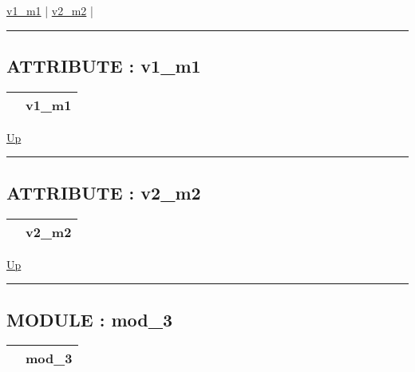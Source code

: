 \par


\hyperlink{ecldoc:intest.example_2.mod_2.v1_m1}{v1\_m1}  |
\hyperlink{ecldoc:intest.example_2.mod_2.v2_m2}{v2\_m2}  |

\rule{\textwidth}{0.4pt}

\subsection*{ATTRIBUTE : v1\_m1}
\hypertarget{ecldoc:intest.example_2.mod_2.v1_m1}{}

{\renewcommand{\arraystretch}{1.5}
\begin{tabularx}{\textwidth}{|>{\raggedright\arraybackslash}l|X|}
\hline
\hspace{0pt} & v1\_m1 \\
\hline
\end{tabularx}
}

\hyperlink{ecldoc:intest.example_2.mod_2}{Up}

\par


\rule{\textwidth}{0.4pt}
\subsection*{ATTRIBUTE : v2\_m2}
\hypertarget{ecldoc:intest.example_2.mod_2.v2_m2}{}

{\renewcommand{\arraystretch}{1.5}
\begin{tabularx}{\textwidth}{|>{\raggedright\arraybackslash}l|X|}
\hline
\hspace{0pt} & v2\_m2 \\
\hline
\end{tabularx}
}

\hyperlink{ecldoc:intest.example_2.mod_2}{Up}

\par


\rule{\textwidth}{0.4pt}


\subsection*{MODULE : mod\_3}
\hypertarget{ecldoc:intest.example_2.mod_3}{}

{\renewcommand{\arraystretch}{1.5}
\begin{tabularx}{\textwidth}{|>{\raggedright\arraybackslash}l|X|}
\hline
\hspace{0pt} & mod\_3 \\
\hline
\end{tabularx}
}

